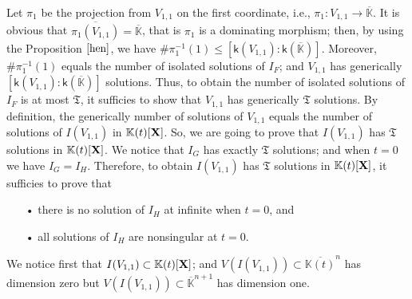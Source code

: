 \documentclass[11pt]{article}
\numberwithin{Property}{section}
\numberwithin{Theorem}{section}
\numberwithin{Proposition}{section}
\numberwithin{Lemma}{section}
\numberwithin{Corollary}{section}
\numberwithin{Definition}{section}
\numberwithin{Remark}{section}
\numberwithin{Conjecture}{section}
\numberwithin{Problem}{section}
\numberwithin{Example}{section}
\numberwithin{Claim}{section}
\renewcommand{\leq}{\leqslant}
\def\bar{\overline}
\newcommand{\field}{\mathbb{K}} %
\newcommand{\mat}[1]{\mathbf{\MakeUppercase{#1}}} %
\begin{document}
Let $\pi_1$ be the projection from $V_{1,1}$ on the first coordinate, i.e., $\pi_1: V_{1,1} \to \bar{\field}$. It is obvious that $\bar{\pi_1(V_{1,1})} = \bar{\field}$, that is $\pi_1$ is a dominating morphism; then, by using the Proposition $\ref{hen}$, we have $\#\pi_1^{-1}(1) \leq [ \mathsf{k}(V_{1,1}) : \mathsf{k}(\bar{\field})]$. Moreover, $\#\pi_1^{-1}(1)$ equals the number of isolated solutions of $I_F$; and $V_{1,1}$ has generically $[ \mathsf{k}(V_{1,1}) : \mathsf{k}(\bar{\field})]$ solutions. Thus, to obtain the number of isolated solutions of $I_F$ is at most $\mathfrak{T}$, it sufficies to show that $V_{1,1}$ has generically $\mathfrak{T}$ solutions. By definition, the generically number of solutions of $V_{1,1}$ equals the number of solutions of $I(V_{1,1})$ in $\field(t)[\mat{X}]$. So, we are going to prove that $I(V_{1,1})$ has $\mathfrak{T}$ solutions in $\field(t)[\mat{X}]$. We notice that $I_G$ has exactly $\mathfrak{T}$ solutions; and when $t = 0$ we have $I_G = I_H$. Therefore, to obtain $I(V_{1,1})$ has $\mathfrak{T}$ solutions in $\field(t)[\mat{X}]$, it sufficies to prove that 
\begin{itemize}
\item[•] there is no solution of $I_H$ at infinite when $t = 0$, and 
\item[•] all solutions of $I_H$ are nonsingular at $t = 0$. 
\end{itemize}

We notice first that $I(V_{1,1}) \subset \field(t)[\mat{X}]$; and $V(I(V_{1,1})) \subset \bar{\field(t)}^n$ has dimension zero but $V(I(V_{1,1})) \subset \bar{\field}^{n+1}$ has dimension one. 
\end{document}
